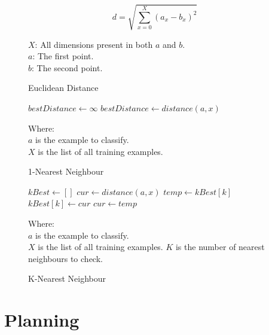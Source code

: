 \documentclass[11pt,fleqn,twoside]{article}
\begin{document}
\begin{figure}[p]
\[
d = \sqrt{\sum^X_{x=0}{(a_x - b_x)^2}}
\]

\(X\): All dimensions present in both \(a\) and \(b\).\\
\(a\): The first point.\\
\(b\): The second point.
\caption{Euclidean Distance}
\label{eq:euclidean}
\end{figure}

\begin{figure}
\begin{algorithmic}
\State $bestDistance \gets \infty$
		\State $bestDistance \gets distance(a, x)$
	\EndIf
\EndFor
\end{algorithmic}

Where:\\
\(a\) is the example to classify.\\
\(X\) is the list of all training examples.
\caption{1-Nearest Neighbour}
\label{fig:1-nn}
\end{figure}

\begin{figure}
\begin{algorithmic}
\State $kBest \gets []$
	\State $cur \gets distance(a, x)$
			\State $temp \gets kBest[k]$
			\State $kBest[k] \gets cur$
			\State $cur \gets temp$
		\EndIf
	\EndFor
\EndFor
\end{algorithmic}
Where:\\
$a$ is the example to classify.\\
$X$ is the list of all training examples.
$K$ is the number of nearest neighbours to check.
\caption{K-Nearest Neighbour}
\label{fig:k-nn}
\end{figure}

\section{Planning}

%
%
\end{document}
